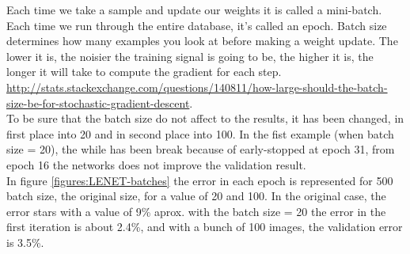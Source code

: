 




Each time we take a sample and update our weights it is called a mini-batch. Each time we run through the entire database, it's called an epoch. Batch size determines how many examples you look at before making a weight update. The lower it is, the noisier the training signal is going to be, the higher it is, the longer it will take to compute the gradient for each step. \url{http://stats.stackexchange.com/questions/140811/how-large-should-the-batch-size-be-for-stochastic-gradient-descent}.\\


To be sure that the batch size do not affect to the results, it has been changed, in first place into 20 and in second place into 100. In the fist example (when batch size = 20), the while has been break because of early-stopped at epoch 31, from epoch 16 the networks does not improve the validation result.\\

In figure \ref{figures:LENET-batches} the error in each epoch is represented  for 500 batch size, the original size, for a value of 20 and 100. In the original case, the error stars with a value of 9\% aprox. with the batch size = 20 the error in the first iteration is about 2.4\%, and with a bunch of 100 images, the validation error is 3.5\%.

